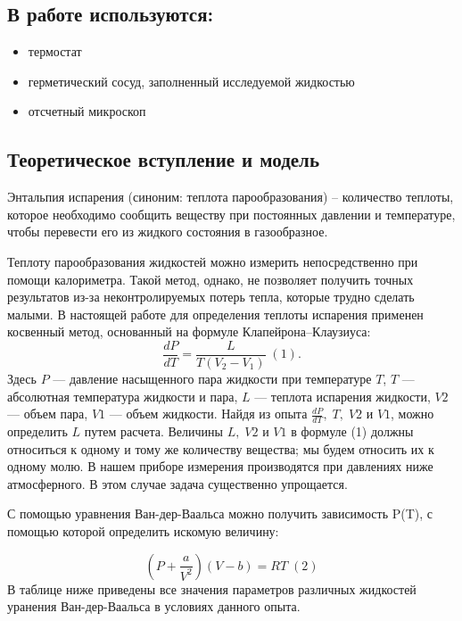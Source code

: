 \documentclass[a4paper,11.5pt]{article} %
\begin{document}
\subsection{В работе используются:}
\begin{itemize}
    \item термостат
    \item герметический сосуд, заполненный исследуемой жидкостью
    \item отсчетный микроскоп
\end{itemize}

\subsection{Теоретическое вступление и модель}

Энтальпия испарения (синоним: теплота парообразования) -- количество теплоты, которое необходимо сообщить веществу при постоянных давлении и температуре, чтобы перевести его из жидкого состояния в газообразное.

Теплоту парообразования жидкостей можно измерить непосредственно при помощи калориметра. Такой метод, однако, не позволяет получить точных результатов из-за неконтролируемых потерь тепла, которые трудно сделать малыми. В настоящей работе для определения теплоты испарения применен
косвенный метод, основанный на формуле Клапейрона–Клаузиуса: $$\frac{dP}
{dT} = \frac{L}{T(V_2 - V_1)}\;(1).$$
Здесь $P$ — давление насыщенного пара жидкости при температуре $T$, $T$ — абсолютная температура жидкости и пара, $L$ — теплота испарения жидкости, $V2$ — объем пара, $V1$ — объем жидкости. Найдя из опыта $\frac{dP}{dT},\; T,\; V2$ и $V1$, можно определить $L$ путем расчета. Величины $L, \;V2$ и $V1$ в формуле (1) должны относиться к одному и тому же количеству вещества; мы будем относить их к одному молю.
В нашем приборе измерения производятся при давлениях ниже атмосферного. В этом случае задача существенно упрощается.

С помощью уравнения Ван-дер-Ваальса можно получить зависимость P(T), с помощью которой определить искомую величину:

$$(P+\frac{a}{V^2})(V-b)=RT \; (2)$$
В таблице ниже приведены все значения параметров различных жидкостей уранения Ван-дер-Ваальса в условиях данного опыта.

\begin{figure}[h]
\end{figure}
\end{document}
